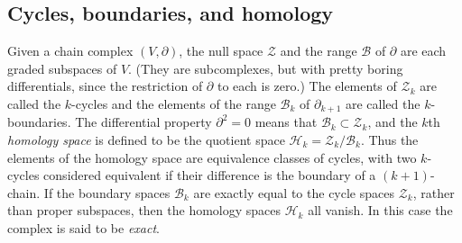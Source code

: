 \subsection{{Cycles, boundaries, and homology}}\label{sec:cycles-boundaries-homology}

{Given a chain complex $(V,\partial)$, the null space $\mathcal Z$ and the range $\mathcal B$ of $\partial$ are each graded subspaces of $V$. (They are subcomplexes, but with pretty boring differentials, since the restriction of $\partial$ to each is zero.) The elements of $\mathcal Z_k$ are called the $k$-cycles and the elements of the range $\mathcal B_k$ of $\partial_{k+1}$ are called the $k$-boundaries. The differential property $\partial^2=0$ means that $\mathcal B_k\subset\mathcal Z_k$, and the $k$th \emph{homology space} is defined to be the quotient space $\mathcal H_k=\mathcal Z_k/\mathcal B_k$. Thus the elements of the homology space are equivalence classes of cycles, with two $k$-cycles considered equivalent if their difference is the boundary of a $(k+1)$-chain. If the boundary spaces $\mathcal B_k$ are exactly equal to the cycle spaces $\mathcal Z_k$, rather than proper subspaces, then the homology spaces $\mathcal H_k$ all vanish. In this case the complex is said to be \emph{exact}.}
